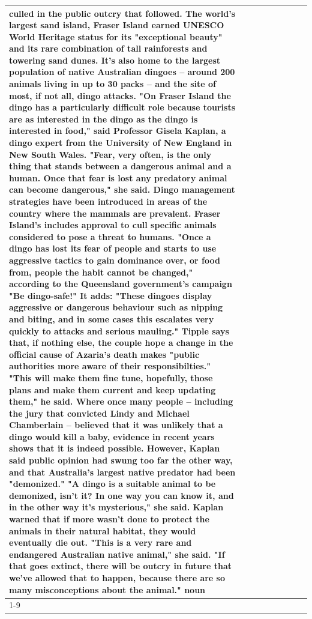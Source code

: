 \begin{table}[H]
\begin{tabular}{lllrlllll}
culled in the public outcry that followed. The world's largest sand island, Fraser Island earned UNESCO World Heritage status for its "exceptional beauty" and its rare combination of tall rainforests and towering sand dunes. It's also home to the largest population of native Australian dingoes -- around 200 animals living in up to 30 packs -- and the site of most, if not all, dingo attacks. "On Fraser Island the dingo has a particularly difficult role because tourists are as interested in the dingo as the dingo is interested in food," said Professor Gisela Kaplan, a dingo expert from the University of New England in New South Wales. "Fear, very often, is the only thing that stands between a dangerous animal and a human. Once that fear is lost any predatory animal can become dangerous," she said. Dingo management strategies have been introduced in areas of the country where the mammals are prevalent. Fraser Island's includes approval to cull specific animals considered to pose a threat to humans. "Once a dingo has lost its fear of people and starts to use aggressive tactics to gain dominance over, or food from, people the habit cannot be changed," according to the Queensland government's campaign "Be dingo-safe!" It adds: "These dingoes display aggressive or dangerous behaviour such as nipping and biting, and in some cases this escalates very quickly to attacks and serious mauling." Tipple says that, if nothing else, the couple hope a change in the official cause of Azaria's death makes "public authorities more aware of their responsibilties." "This will make them fine tune, hopefully, those plans and make them current and keep updating them," he said. Where once many people -- including the jury that convicted Lindy and Michael Chamberlain -- believed that it was unlikely that a dingo would kill a baby, evidence in recent years shows that it is indeed possible. However, Kaplan said public opinion had swung too far the other way, and that Australia's largest native predator had been "demonized." "A dingo is a suitable animal to be demonized, isn't it? In one way you can know it, and in the other way it's mysterious," she said. Kaplan warned that if more wasn't done to protect the animals in their natural habitat, they would eventually die out. "This is a very rare and endangered Australian native animal," she said. "If that goes extinct, there will be outcry in future that we've allowed that to happen, because there are so many misconceptions about the animal." noun \\
\cline{1-9}

\end{tabular}
\end{table}
